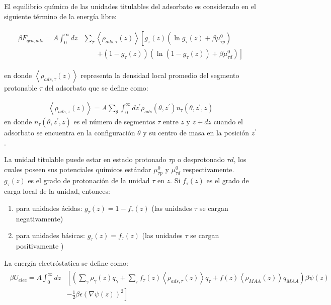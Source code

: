 El equilibrio qu\'imico de las unidades titulables del adsorbato  es considerado en el siguiente t\'ermino de la energ\'ia libre:

\begin{align}
	\begin{aligned}
		\beta F_{qca,ads} = A\int_0^\infty dz& \sum_\tau \left<\rho_{ads,\tau}(z)\right> \left[g_\tau(z)(\ln g_\tau(z)+ \beta\mu^0_{\tau p})\right.\\
		&\qquad\left.+(1-g_\tau(z))(\ln (1-g_\tau(z))+\beta\mu^0_{\tau d})\right]   
	\end{aligned}
\end{align} 

\noindent en donde $\left<\rho_{ads,\tau}(z)\right>$ representa la densidad local promedio del segmento protonable $\tau$ del adsorbato que se define como:

\begin{align}
	\left<\rho_{ads,\tau}(z)\right> = A\sum_\theta \int^\infty_0 dz^\prime  \rho_{ads}(\theta,z^\prime)n_\tau(\theta,z^\prime, z)
	\label{eq:film:segments_pro_si}
\end{align}
\noindent en donde $n_\tau(\theta,z^\prime, z)$ es el n\'umero de segmentos $\tau$ entre  $z$ y $z+ dz$ cuando el adsorbato se encuentra en la configuraci\'on $\theta$ y su centro de masa en la posici\'on $z^\prime$.

La unidad titulable puede estar en estado protonado $\tau p$ o desprotonado $\tau d$, los cuales poseen sus potenciales qu\'imicos est\'andar $\mu^0_{\tau p}$ y $\mu^0_{\tau d}$ respectivamente. 
$g_\tau (z)$ es el grado de protonaci\'on de la unidad $\tau$ en $z$. Si $f_\tau (z)$ es el grado de carga local de la unidad, entonces:


\begin{enumerate}
	\item para unidades \'acidas: $g_\tau(z) = 1-f_\tau(z)$ (las unidades $\tau$ se cargan negativamente)
	\item para unidades b\'asicas: $g_\tau(z) = f_\tau(z)$ (las  unidades $\tau$ se cargan positivamente  )
\end{enumerate}


La energ\'ia electr\'ostatica se define como:
\begin{align}
	\begin{aligned}
		\beta U_{elec}= A\int_0^\infty dz&\left[\left(\sum_{\gamma } {\rho_\gamma(z) q_\gamma + \sum_\tau{f_\tau(z) \left<\rho_{ads,\tau}(z)\right> q_\tau} +  f(z)\left<\rho_{MAA}(z)\right>q_{MAA}}\right)\beta\psi(z) \right. \\ &\left.-\frac{1}{2}\beta\epsilon(\nabla\psi(z))^2 \right]
	\end{aligned}
\end{align} 

